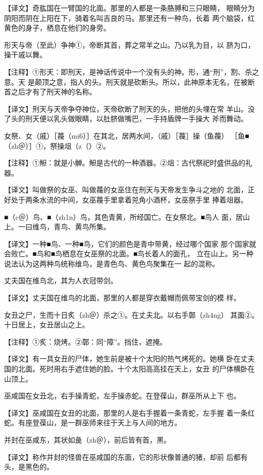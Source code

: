 \documentclass[a4paper,12pt,UTF8,twoside]{ctexbook}
\begin{document}
【译文】奇肱国在一臂国的北面。那里的人都是一条胳膊和三只眼睛， 眼睛分为阴阳而阴在上阳在下，骑着名叫吉良的马。那里还有一种鸟，长着 两个脑袋，红黄色的身子，栖息在他们的身旁。

形天与帝（至此）争神①，帝断其首，葬之常羊之山。乃以乳为目，以 脐为口，操干戚以舞。

【注释】①形天：即刑天，是神话传说中一个没有头的神。形，通“刑”，割、杀之意。天 是颠顶之意，指人的头。刑天就是砍断头。所以，此神原本无名，在被断首之后才有了刑天神的名称。

【译文】刑天与天帝争夺神位，天帝砍断了刑天的头，把他的头埋在常 羊山。没了头的刑天便以乳头做眼睛，以肚脐做嘴巴，一手持盾牌一手操大 斧而舞动。

女祭、女（戚）［薎（mi6）］在其北，居两水间，（戚）［薎］操（鱼薎） ［鱼■（zh＠）］①，祭操俎（z（）②。

【注释】①觛：就是小觯。觛是古代的一种酒器。②俎：古代祭祀时盛供品的礼器。

【译文】叫做祭的女巫、叫做薎的女巫住在刑天与天帝发生争斗之地的 北面，正好处于两条水流的中间，女巫薎手里拿着兕角小酒杯，女巫祭手里 捧着俎器。

■（c＠）鸟、■（zh1n）鸟，其色青黄，所经国亡。在女祭北。■鸟人 面，居山上。一曰维鸟，青鸟、黄鸟所集。

【译文】一种■鸟、一种■鸟，它们的颜色是青中带黄，经过哪个国家 那个国家就会败亡。■鸟和■鸟栖息在女巫祭的北面。■鸟长着人的面孔， 立在山上。另一种说法认为这两种鸟统称维鸟，是青色鸟、黄色鸟聚集在一 起的混称。

丈夫国在维鸟北，其为人衣冠带剑。

【译文】丈夫国在维鸟的北面，那里的人都是穿衣戴帽而佩带宝剑的模 样。

女丑之尸，生而十日炙（zh＠）杀之①。在丈夫北。以右手鄣（zh4ng） 其面②。十日居上，女丑居山之上。

【注释】①炙：烧烤。②鄣：同“障”。挡住，遮掩。

【译文】有一具女丑的尸体，她生前是被十个太阳的热气烤死的。她横 卧在丈夫国的北面。死时用右手遮住她的脸。十个太阳高高挂在天上，女丑 的尸体横卧在山顶上。

巫咸国在女丑北，右手操青蛇，左手操赤蛇。在登葆山，群巫所从上下 也。

【译文】巫咸国在女丑的北面，那里的人是右手握着一条青蛇，左手握 着一条红蛇。有座登葆山，是一群巫师来往于天上与人间的地方。

并封在巫咸东，其状如彘（zh＠），前后皆有首，黑。

【译文】称作并封的怪兽在巫咸国的东面，它的形状像普通的猪，却前 后都有头，是黑色的。
\end{document}
